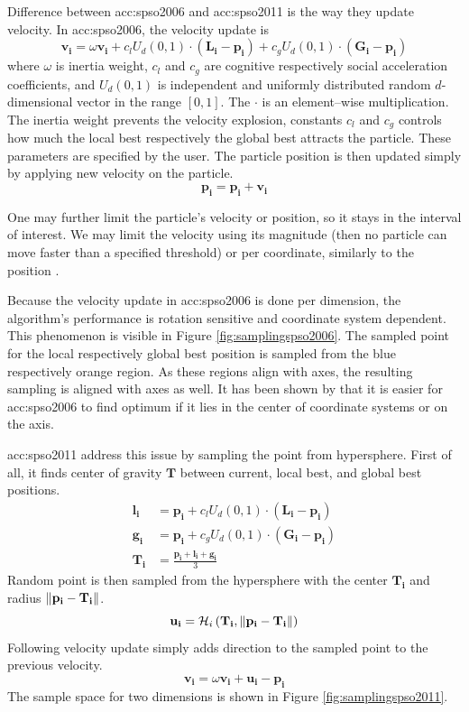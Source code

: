 Difference between \acrshort{acc:spso2006} and \acrshort{acc:spso2011} is the way they update velocity. In \acrshort{acc:spso2006}, the velocity update is
$$
\mathbf{v_i} = \omega\mathbf{v_i} 
+ c_l U_d\left( 0,1 \right) \cdot \left( \mathbf{L_i} - \mathbf{p_i} \right)
+ c_g U_d\left( 0,1 \right) \cdot \left( \mathbf{G_i} - \mathbf{p_i} \right)
$$ 
where $\omega$ is inertia weight, $c_l$ and $c_g$ are cognitive respectively social acceleration coefficients, and $U_d(0,1)$ is independent and uniformly distributed random $d$-dimensional vector in the range $\left[ 0,1 \right]$. The $\cdot$ is an element--wise multiplication. The inertia weight prevents the velocity explosion, constants $c_l$ and $c_g$ controls how much the local best respectively the global best attracts the particle. These parameters are specified by the user. The particle position is then updated simply by applying new velocity on the particle.
$$
\mathbf{p_i} = \mathbf{p_i} + \mathbf{v_i}
$$

One may further limit the particle's velocity or position, so it stays in the interval of interest. We may limit the velocity using its magnitude (then no particle can move faster than a specified threshold) or per coordinate, similarly to the position \citep{PSOvelocitylimit}.

Because the velocity update in \acrshort{acc:spso2006} is done per dimension, the algorithm's performance is rotation sensitive and coordinate system dependent. This phenomenon is visible in Figure \ref{fig:samplingspso2006}. The sampled point for the local respectively global best position is sampled from the blue respectively orange region. As these regions align with axes, the resulting sampling is aligned with axes as well. It has been shown by \citet{psobiasinzero} that it is easier for \acrshort{acc:spso2006} to find optimum if it lies in the center of coordinate systems or on the axis.

\acrshort{acc:spso2011} address this issue by sampling the point from hypersphere. First of all, it finds center of gravity $\mathbf{T}$ between current, local best, and global best positions.
\begin{align*}
    \mathbf{l_i} &= \mathbf{p_i} + c_l U_d\left( 0,1 \right) \cdot \left( \mathbf{L_i} - \mathbf{p_i} \right) \\
    \mathbf{g_i} &= \mathbf{p_i} + c_g U_d\left( 0,1 \right) \cdot \left( \mathbf{G_i} - \mathbf{p_i} \right) \\
    \mathbf{T_i} &= \frac{\mathbf{p_i}+\mathbf{l_i}+\mathbf{g_i}}{3}
\end{align*}
Random point is then sampled from the hypersphere with the center $\mathbf{T_i}$ and radius $\left\lVert\mathbf{p_i} - \mathbf{T_i}\right\rVert$.
$$
\mathbf{u_i} = \mathcal{H}_i\left(\mathbf{T_i}, \left\lVert\mathbf{p_i} - \mathbf{T_i}\right\rVert\right)
$$
Following velocity update simply adds direction to the sampled point to the previous velocity.
$$
\mathbf{v_i} = \omega\mathbf{v_i}+\mathbf{u_i}-\mathbf{p_i}
$$
The sample space for two dimensions is shown in Figure \ref{fig:samplingspso2011}.
